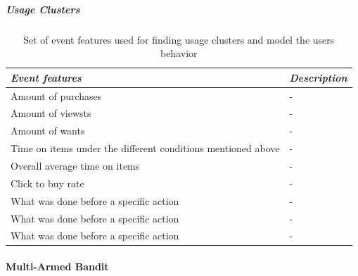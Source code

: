 
        \subparagraph{Usage Clusters} %
        \label{subp:usage_clusters}
            \begin{table}[H]
                \centering
                \begin{tabular}{l|l}
                    \emph{Event features} & \emph{Description} \\ \hline
                    Amount of purchases & - \\ \hline
                    Amount of viewsts & - \\ \hline
                    Amount of wants & - \\ \hline
                    Time on items under the different conditions mentioned above & -\\ \hline
                    Overall average time on items & - \\ \hline
                    Click to buy rate & - \\ \hline
                    What was done before a specific action & - \\ \hline
                    What was done before a specific action & - \\ \hline
                    What was done before a specific action & - \\
                \end{tabular}
                \caption[Event Features]{Set of event features used for finding usage clusters and model the users behavior}
                \label{table:evaluationcoldstart}
            \end{table}





\paragraph{Multi-Armed Bandit} %
\label{par:multi_armed_bandit}


